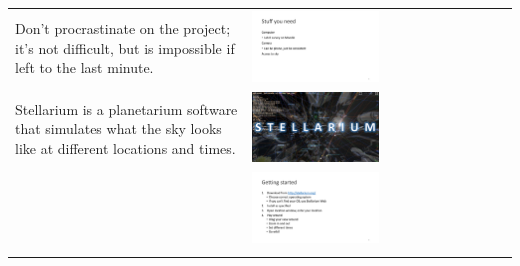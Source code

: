 \documentclass[12pt]{article}
\begin{document}
\begin{longtable}{m{}m{}}
Don't procrastinate on the project; it's not difficult, but is impossible if left to the last minute. & \includegraphics[width=0.5\textwidth]{ppt/lab01/Slide7.jpeg}\\
Stellarium is a planetarium software that simulates what the sky looks like at different locations and times. & \includegraphics[width=0.5\textwidth]{ppt/lab01/Slide8.jpeg}\\
 & \includegraphics[width=0.5\textwidth]{ppt/lab01/Slide9.jpeg}\\
\label{default}
\end{longtable}
\end{document}
